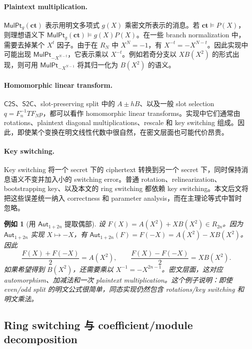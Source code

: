\documentclass[UTF8,11pt]{article}
\newcommand{\CtwoS}{\mathsf{C2S}}
\newcommand{\StwoC}{\mathsf{S2C}}
\newcommand{\ct}{\mathbf{ct}}
\theoremstyle{definition}
\theoremstyle{plain}
\newtheorem{example}{例如}
\begin{document}
\paragraph{Plaintext multiplication.}
\({\mathsf{MulPt}}_{g}(\ct)\) 表示用明文多项式 \(g(X)\) 乘密文所表示的消息。若 \(\ct\vDash P(X)\)，则理想语义下 \({\mathsf{MulPt}}_{g}(\ct)\vDash g(X)P(X)\)。在一些 branch normalization 中，需要去掉某个 \(X^t\) 因子。由于在 \(R_N\) 中 \(X^N=-1\)，有 \(X^{-t}=-X^{N-t}\)。因此实现中可能出现 \({\mathsf{MulPt}}_{-X^{N-t}}\)，它表示乘以 \(X^{-t}\)。例如若奇分支以 \(X B(X^2)\) 的形式出现，则可用 \({\mathsf{MulPt}}_{-X^{N-1}}\) 将其归一化为 \(B(X^2)\) 的语义。

\paragraph{Homomorphic linear transform.}
\(\CtwoS\)、\(\StwoC\)、slot-preserving split 中的 \(A\pm hB\)、以及一般 slot selection \(q=F_n^{-1}TF_Np\)，都可以看作 homomorphic linear transforms。实现中它们通常由 rotations、plaintext diagonal multiplications、rescale 和 key switching 组成。因此，即使某个变换在明文线性代数中很自然，在密文层面也可能代价昂贵。

\paragraph{Key switching.}
Key switching 将一个 secret 下的 ciphertext 转换到另一个 secret 下，同时保持消息语义不变并加入小的 switching error。普通 rotation、relinearization、bootstrapping key、以及本文的 ring switching 都依赖 key switching。本文后文将把这些误差统一纳入 correctness 和 parameter analysis，而在主理论等式中暂时忽略。

\begin{example}[用 \({\mathsf{Aut}}_{1+2n}\) 提取偶部]
设 \(F(X)=A(X^2)+XB(X^2)\in R_{2n}\)。因为 \({\mathsf{Aut}}_{1+2n}\) 实现 \(X\mapsto -X\)，有 \({\mathsf{Aut}}_{1+2n}(F)=F(-X)=A(X^2)-XB(X^2)\)。因此
\[
\frac{F(X)+F(-X)}{2}=A(X^2),
\qquad
\frac{F(X)-F(-X)}{2}=XB(X^2).
\]
如果希望得到 \(B(X^2)\)，还需要乘以 \(X^{-1}=-X^{2n-1}\)。密文层面，这对应 automorphism、加减法和一次 plaintext multiplication。这个例子说明：即使 even/odd split 的明文公式很简单，同态实现仍然包含 rotations/key switching 和明文乘法。
\end{example}

\subsection{Ring switching 与 coefficient/module decomposition}
\label{subsec:ring-switching-prelim}
\end{document}
